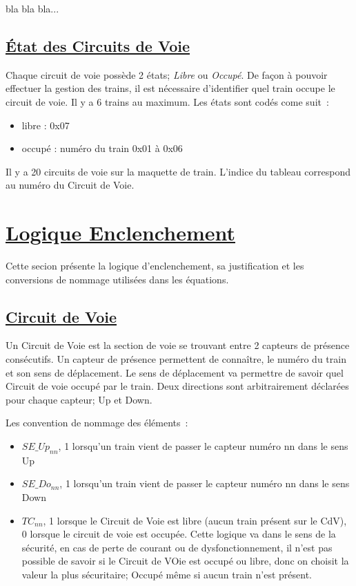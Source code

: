 bla bla bla...

  
\subsection{\underline{\'Etat des Circuits de Voie}}
\label{sec:st_sig}

Chaque circuit de voie possède 2 états; \emph{Libre} ou
\emph{Occupé}. De façon à pouvoir effectuer la gestion des trains, il
est nécessaire d'identifier quel train occupe le circuit de voie.  Il
y a 6 trains au maximum. Les états sont codés come suit~:
\begin{itemize}
  \item libre : 0x07
  \item occupé : numéro du train 0x01 à 0x06
\end{itemize}  

Il y a 20 circuits de voie sur la maquette de train. L'indice du
tableau correspond au numéro du Circuit de Voie.




\newpage
\section{\underline{Logique Enclenchement}}
\label{sec:log_enc}

Cette secion présente la logique d'enclenchement, sa justification et
les conversions de nommage utilisées dans les équations.

\subsection{\underline{Circuit de Voie}}
\label{sec:CdV}

Un Circuit de Voie est la section de voie se trouvant entre 2 capteurs
de présence consécutifs. Un capteur de présence permettent de
connaître, le numéro du train et son sens de déplacement. Le sens de
déplacement va permettre de savoir quel Circuit de voie occupé par le
train. Deux directions sont arbitrairement déclarées pour chaque
capteur; Up et Down.

Les convention de nommage des éléments~:
\begin{itemize}
\item $SE\_Up_{nn}$, 1 lorsqu'un train vient de passer le capteur numéro
  nn dans le sens Up
\item $SE\_Do_{nn}$, 1 lorsqu'un train vient de passer le capteur numéro
  nn dans le sens Down
\item $TC_{nn}$, 1 lorsque le Circuit de Voie est libre (aucun train
  présent sur le CdV), 0 lorsque le circuit de voie est occupée. Cette
  logique va dans le sens de la sécurité, en cas de perte de courant
  ou de dysfonctionnement, il n'est pas possible de savoir si le
  Circuit de VOie est occupé ou libre, donc on choisit la valeur la
  plus sécuritaire; Occupé même si aucun train n'est présent.
\end{itemize}

